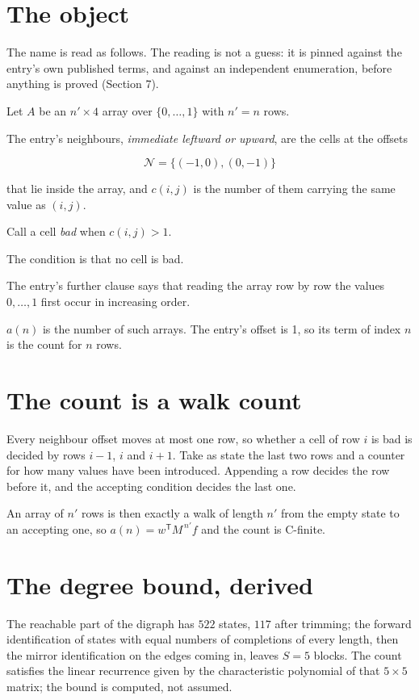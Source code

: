 \documentclass[11pt]{article}
\theoremstyle{definition}
\begin{document}
\section{The object}

The name is read as follows. The reading is not a guess: it is pinned against the entry's own published terms, and against an independent enumeration, before anything is proved (Section 7).

Let $A$ be an $n' \times 4$ array over $\{0,\dots,1\}$ with $n' = n$ rows.

The entry's neighbours, {\itshape immediate leftward or upward}, are the cells at the offsets

\[\mathcal{N} = \{(-1,0), (0,-1)\}\]

that lie inside the array, and $c(i,j)$ is the number of them carrying the same value as $(i,j)$.

Call a cell {\itshape bad} when $c(i,j) > 1$.

The condition is that no cell is bad.

The entry's further clause says that reading the array row by row the values $0,\dots,1$ first occur in increasing order.

$a(n)$ is the number of such arrays. The entry's offset is 1, so its term of index $n$ is the count for $n$ rows.

\section{The count is a walk count}

Every neighbour offset moves at most one row, so whether a cell of row $i$ is bad is decided by rows $i-1$, $i$ and $i+1$. Take as state the last two rows and a counter for how many values have been introduced. Appending a row decides the row before it, and the accepting condition decides the last one.

An array of $n'$ rows is then exactly a walk of length $n'$ from the empty state to an accepting one, so $a(n) = w^{\mathsf T}M^{\,n'}f$ and the count is C-finite.

\section{The degree bound, derived}

The reachable part of the digraph has $522$ states, $117$ after trimming; the forward identification of states with equal numbers of completions of every length, then the mirror identification on the edges coming in, leaves $S = 5$ blocks. The count satisfies the linear recurrence given by the characteristic polynomial of that $5\times5$ matrix; the bound is computed, not assumed.
\end{document}
